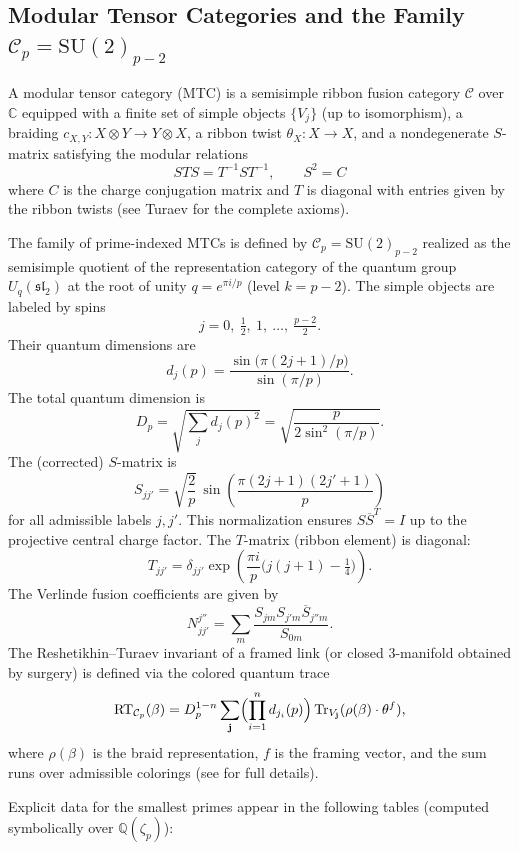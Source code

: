 \documentclass[11pt,a4paper]{amsart}
\begin{document}
\subsection{Modular Tensor Categories and the Family \(\mathcal{C}_p = \mathrm{SU}(2)_{p-2}\)}
\label{subsec:mtc}

A modular tensor category (MTC) is a semisimple ribbon fusion category \(\mathcal{C}\) over \(\mathbb{C}\) equipped with a finite set of simple objects \(\{V_j\}\) (up to isomorphism), a braiding \(c_{X,Y}:X\otimes Y\to Y\otimes X\), a ribbon twist \(\theta_X:X\to X\), and a nondegenerate \(S\)-matrix satisfying the modular relations
\[
S T S = T^{-1} S T^{-1},\qquad S^2 = C
\]
where \(C\) is the charge conjugation matrix and \(T\) is diagonal with entries given by the ribbon twists (see Turaev \cite{TuraevBook} for the complete axioms).

The family of prime-indexed MTCs is defined by \(\mathcal{C}_p = \mathrm{SU}(2)_{p-2}\) realized as the semisimple quotient of the representation category of the quantum group \(U_q(\mathfrak{sl}_2)\) at the root of unity \(q = e^{\pi i / p}\) (level \(k = p-2\)). The simple objects are labeled by spins
\[
j = 0,\ \tfrac12,\ 1,\ \dots,\ \tfrac{p-2}{2}.
\]
Their quantum dimensions are
\[
d_j(p) = \frac{\sin\bigl(\pi(2j+1)/p\bigr)}{\sin(\pi/p)}.
\]
The total quantum dimension is
\[
D_p = \sqrt{\sum_j d_j(p)^2} = \sqrt{\frac{p}{2\sin^2(\pi/p)}}.
\]
The (corrected) \(S\)-matrix is
\[
S_{jj'} = \sqrt{\frac{2}{p}}\,\sin\left( \frac{\pi(2j+1)(2j'+1)}{p} \right)
\]
for all admissible labels \(j,j'\). This normalization ensures \(S\overline{S}^T = I\) up to the projective central charge factor. The \(T\)-matrix (ribbon element) is diagonal:
\[
T_{jj'} = \delta_{jj'}\exp\left( \frac{\pi i}{p} \bigl(j(j+1) - \tfrac14\bigr) \right).
\]
The Verlinde fusion coefficients are given by
\[
N_{jj'}^{j''} = \sum_m \frac{S_{jm}S_{j'm}\overline{S}_{j''m}}{S_{0m}}.
\]
The Reshetikhin--Turaev invariant of a framed link (or closed 3-manifold obtained by surgery) is defined via the colored quantum trace
\[
\mathrm{RT}_{\mathcal{C}_p}(\beta) = D_p^{1-n} \sum_{\mathbf{j}} \Bigl( \prod_{i=1}^n d_{j_i}(p) \Bigr) \operatorname{Tr}_{V_{\mathbf{j}}}(\rho(\beta)\cdot \theta^{f}),
\]
where \(\rho(\beta)\) is the braid representation, \(f\) is the framing vector, and the sum runs over admissible colorings (see \cite{ReshetikhinTuraev1991} for full details).

Explicit data for the smallest primes appear in the following tables (computed symbolically over \(\mathbb{Q}(\zeta_p)\)):
\end{document}
